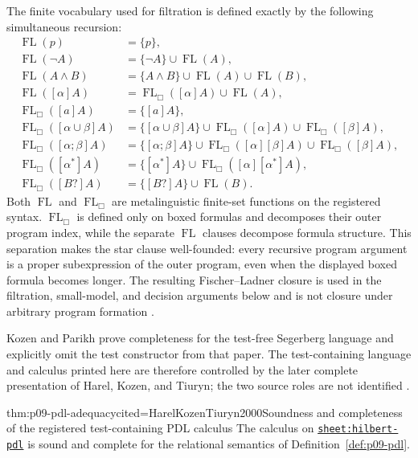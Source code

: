 The finite vocabulary used for filtration is defined exactly by the following
simultaneous recursion:
\[
\begin{aligned}
 \operatorname{FL}(p)
   &=\{p\},\\
 \operatorname{FL}(\neg A)
   &=\{\neg A\}\cup\operatorname{FL}(A),\\
 \operatorname{FL}(A\land B)
   &=\{A\land B\}\cup\operatorname{FL}(A)\cup\operatorname{FL}(B),\\
 \operatorname{FL}([\alpha]A)
   &=\operatorname{FL}_{\Box}([\alpha]A)\cup\operatorname{FL}(A),\\[2pt]
 \operatorname{FL}_{\Box}([a]A)
   &=\{[a]A\},\\
 \operatorname{FL}_{\Box}([\alpha\cup\beta]A)
   &=\{[\alpha\cup\beta]A\}
     \cup\operatorname{FL}_{\Box}([\alpha]A)
     \cup\operatorname{FL}_{\Box}([\beta]A),\\
 \operatorname{FL}_{\Box}([\alpha;\beta]A)
   &=\{[\alpha;\beta]A\}
     \cup\operatorname{FL}_{\Box}([\alpha][\beta]A)
     \cup\operatorname{FL}_{\Box}([\beta]A),\\
 \operatorname{FL}_{\Box}([\alpha^{*}]A)
   &=\{[\alpha^{*}]A\}
     \cup\operatorname{FL}_{\Box}([\alpha][\alpha^{*}]A),\\
 \operatorname{FL}_{\Box}([B?]A)
   &=\{[B?]A\}\cup\operatorname{FL}(B).
\end{aligned}
\]
Both \(\operatorname{FL}\) and \(\operatorname{FL}_{\Box}\) are
metalinguistic finite-set functions on the registered syntax.
\(\operatorname{FL}_{\Box}\) is defined only on boxed formulas and decomposes
their outer program index, while the separate \(\operatorname{FL}\) clauses
decompose formula structure.  This separation makes the star clause
well-founded: every recursive program argument is a proper subexpression of
the outer program, even when the displayed boxed formula becomes longer.
The resulting Fischer--Ladner closure is used in the filtration,
small-model, and decision arguments below and is not closure under arbitrary
program formation \cite[\S6.1]{HarelKozenTiuryn2000}.

Kozen and Parikh prove completeness for the test-free Segerberg language and
explicitly omit the test constructor from that paper.  The test-containing
language and calculus printed here are therefore controlled by the later
complete presentation of Harel, Kozen, and Tiuryn; the two source roles are not
identified \cite{KozenParikh1981,HarelKozenTiuryn2000}.

\begin{hbtheorem}{thm:p09-pdl-adequacy}{cited=HarelKozenTiuryn2000}{Soundness and completeness of the registered test-containing PDL calculus}
The calculus on
\hyperref[sheet:hilbert-pdl]{\texttt{sheet:hilbert-pdl}} is sound and complete
for the relational semantics of Definition~\ref{def:p09-pdl}.
\end{hbtheorem}

